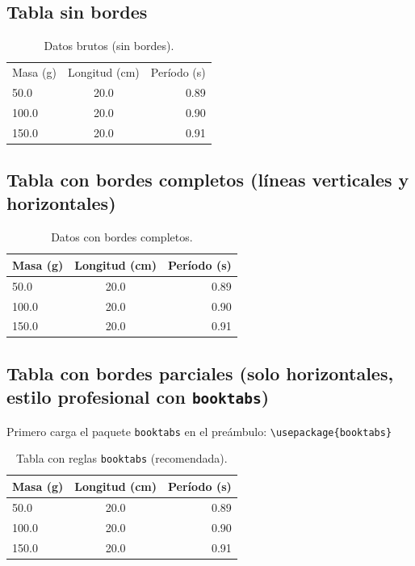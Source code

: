 \subsection{Tabla sin bordes}

\begin{table}[htbp]
  \centering
  \begin{tabular}{l c r}
    Masa (g) & Longitud (cm) & Período (s) \\
    50.0 & 20.0 & 0.89 \\
    100.0 & 20.0 & 0.90 \\
    150.0 & 20.0 & 0.91 \\
  \end{tabular}
  \caption{Datos brutos (sin bordes).}
  \label{tab:sin_bordes}
\end{table}

\subsection{Tabla con bordes completos (líneas verticales y horizontales)}

\begin{table}[htbp]
  \centering
  \begin{tabular}{|l|c|r|}
    \hline
    Masa (g) & Longitud (cm) & Período (s) \\
    \hline
    50.0 & 20.0 & 0.89 \\
    100.0 & 20.0 & 0.90 \\
    150.0 & 20.0 & 0.91 \\
    \hline
  \end{tabular}
  \caption{Datos con bordes completos.}
  \label{tab:bordes_completos}
\end{table}

\subsection{Tabla con bordes parciales (solo horizontales, estilo profesional con \texttt{booktabs})}

Primero carga el paquete \texttt{booktabs} en el preámbulo:
\verb|\usepackage{booktabs}|

\begin{table}[htbp]
  \centering
  \begin{tabular}{l c r}
    \toprule
    Masa (g) & Longitud (cm) & Período (s) \\
    \midrule
    50.0 & 20.0 & 0.89 \\
    100.0 & 20.0 & 0.90 \\
    150.0 & 20.0 & 0.91 \\
    \bottomrule
  \end{tabular}
  \caption{Tabla con reglas \texttt{booktabs} (recomendada).}
  \label{tab:booktabs}
\end{table}
\newpage
